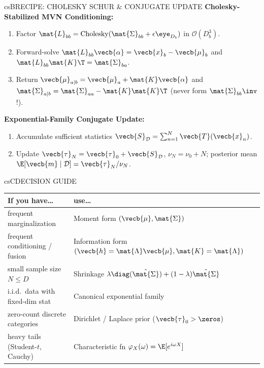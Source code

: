 \documentclass[../../../../master.tex]{subfiles}
\begin{document}
\begin{cscolumns}
\begin{cscard}{csB}{RECIPE: CHOLESKY SCHUR \& CONJUGATE UPDATE}
  \textbf{Cholesky-Stabilized MVN Conditioning:}
  \begin{enumerate}[leftmargin=1.2em, itemsep=1pt, topsep=1pt, parsep=0pt]
    \item Factor $\mat{L}_{bb} = \mathrm{Cholesky}(\mat{\Sigma}_{bb} + \epsilon\eye_{D_b})$ in $\mathcal{O}(D_b^3)$.
    \item Forward-solve $\mat{L}_{bb}\vecb{\alpha} = \vecb{x}_b - \vecb{\mu}_b$ and $\mat{L}_{bb}\mat{K}\T = \mat{\Sigma}_{ba}$.
    \item Return $\vecb{\mu}_{a\mid b} = \vecb{\mu}_a + \mat{K}\vecb{\alpha}$ and $\mat{\Sigma}_{a\mid b} = \mat{\Sigma}_{aa} - \mat{K}\mat{K}\T$ (never form $\mat{\Sigma}_{bb}\inv$!).
  \end{enumerate}
  \vspace{1pt}
  \textbf{Exponential-Family Conjugate Update:}
  \begin{enumerate}[leftmargin=1.2em, itemsep=1pt, topsep=1pt, parsep=0pt]
    \item Accumulate sufficient statistics $\vecb{S}_{\mathcal{D}} = \sum_{n=1}^N \vecb{T}(\vecb{x}_n)$.
    \item Update $\vecb{\tau}_N = \vecb{\tau}_0 + \vecb{S}_{\mathcal{D}}$, $\nu_N = \nu_0 + N$; posterior mean $\E[\vecb{m}\mid\mathcal{D}] = \vecb{\tau}_N/\nu_N$.
  \end{enumerate}
\end{cscard}
\columnbreak

\begin{cscard}{csC}{DECISION GUIDE}
  \renewcommand{\arraystretch}{1.22}\small
  \begin{tabular}{@{}>{\raggedright\arraybackslash}p{3.1cm}>{\raggedright\arraybackslash}p{4.6cm}@{}}
    \textbf{If you have\ldots} & \textbf{use\ldots}\\ \hline
    frequent marginalization & Moment form $(\vecb{\mu},\mat{\Sigma})$\\
    frequent conditioning / fusion & Information form $(\vecb{h}=\mat{\Lambda}\vecb{\mu},\mat{K}=\mat{\Lambda})$\\
    small sample size $N \le D$ & Shrinkage $\lambda\diag(\hat{\mat{\Sigma}}) + (1-\lambda)\hat{\mat{\Sigma}}$\\
    i.i.d.\ data with fixed-dim stat & Canonical exponential family\\
    zero-count discrete categories & Dirichlet / Laplace prior ($\vecb{\tau}_0>\zeros$)\\
    heavy tails (Student-$t$, Cauchy) & Characteristic fn $\varphi_X(\omega)=\E[e^{i\omega X}]$\\
  \end{tabular}
\end{cscard}


\end{cscolumns}
\end{document}
